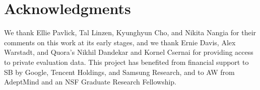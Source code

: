 \section*{Acknowledgments}
We thank Ellie Pavlick, Tal Linzen, Kyunghyun Cho, and Nikita Nangia for their comments on this work at its early stages, and we thank Ernie Davis, Alex Warstadt, and Quora's Nikhil Dandekar and Kornel Csernai for providing access to private evaluation data. 
This project has benefited from financial support to SB by Google, Tencent Holdings, and Samsung Research, and to AW from AdeptMind and an NSF Graduate Research Fellowship.

